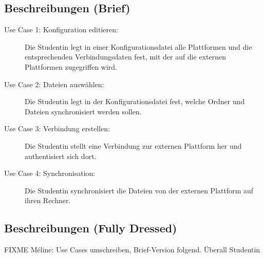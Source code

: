 \documentclass[a4paper]{article}
\begin{document}
\subsection{Beschreibungen (Brief)}
\begin{description}
	
\item[Use Case 1: Konfiguration editieren:] Die Studentin legt in einer Konfigurationsdatei alle Plattformen und die entsprechenden Verbindungsdaten fest, mit der auf die externen Plattformen zugegriffen wird.

\item[Use Case 2: Dateien auswählen:] Die Studentin legt in der Konfigurationsdatei fest, welche Ordner und Dateien synchronisiert werden sollen.

\item[Use Case 3: Verbindung erstellen:] Die Studentin stellt eine Verbindung zur externen Plattform her und authentisiert sich dort.

\item[Use Case 4: Synchronisation:] Die Studentin synchronisiert die Dateien von der externen Plattform auf ihren Rechner.
\end{description}

\pagebreak
\subsection{Beschreibungen (Fully Dressed)}

FIXME Méline: Use Cases umschreiben, Brief-Version folgend. Überall Studentin

\end{document}
